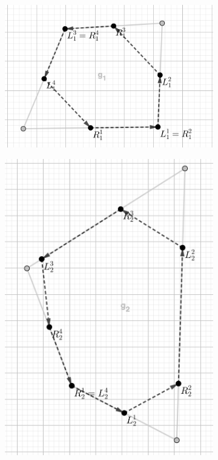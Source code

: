 \documentclass[10pt,a4paper]{elsarticle}
\begin{document}
\begin{figure}[h!]
	\centering
\begin{subfigure}[b]{.35\textwidth}
	\includegraphics[width=\textwidth]{example_tour_g1_Step1_new_gray.png}
	\caption{}
\end{subfigure}
\begin{subfigure}[b]{.35\textwidth}
	\includegraphics[width=\textwidth]{example_tour_g2_Step1_new_gray.png}

\end{subfigure}
\end{figure}
\end{document}
